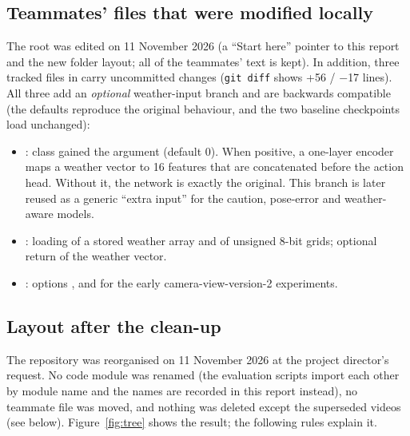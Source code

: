 \subsection{Teammates' files that were modified locally}
The root  was edited on 11 November 2026 (a ``Start here'' pointer to this report and the new folder layout; all of the teammates' text is kept). In addition, three tracked files in  carry uncommitted changes (\texttt{git diff} shows +56 / $-$17 lines). All three add an \emph{optional} weather-input branch and are backwards compatible
(the defaults reproduce the original behaviour, and the two baseline checkpoints load unchanged):
\begin{itemize}
\item {}: class  gained the argument  (default 0). When positive, a one-layer encoder maps a weather vector to 16 features that are concatenated before the action head. Without it, the network is exactly the original.
  This branch is later reused as a generic ``extra input'' for the caution, pose-error and weather-aware models.
\item {}: loading of a stored weather array and of unsigned 8-bit grids; optional return of the weather vector.
\item {}: options ,  and  for the early camera-view-version-2 experiments.
\end{itemize}

\subsection{Layout after the clean-up}\label{sec:cleanup}
The repository was reorganised on 11 November 2026 at the project director's request. No code module was renamed (the evaluation scripts import each other by module name and the names are
recorded in this report instead), no teammate file was moved, and nothing was deleted except the superseded videos (see below).
Figure~\ref{fig:tree} shows the result; the following rules explain it.

